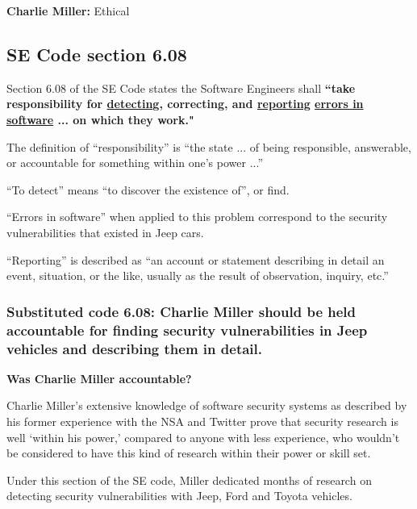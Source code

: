 \documentclass[12pt]{article}
\begin{document}
\begin{multicols}{2}
\begin{framed}
\hspace{-.5cm}\textbf{Charlie Miller:} Ethical
\end{framed}



\subsection{SE Code section 6.08}

Section 6.08 of the SE Code states the Software Engineers shall \textbf{``take responsibility for \underline{detecting}, correcting, and \underline{reporting} \underline{errors in software} ... on which they work."}\cite{seCode}

The definition of ``responsibility'' is ``the state ... of being responsible, answerable, or accountable for something within one's power ...''\cite{dictionary}

``To detect'' means ``to discover the existence of''\cite{dictionary}, or find.

``Errors in software'' when applied to this problem correspond to the security vulnerabilities that existed in Jeep cars. 

``Reporting'' is described as ``an account or statement describing in detail an event, situation, or the like, usually as the result of observation, inquiry, etc.''\cite{dictionary}

\subsubsection{Substituted code 6.08: Charlie Miller should be held accountable for finding security vulnerabilities in Jeep vehicles and describing them in detail.}




\textbf{Was Charlie Miller accountable?}

Charlie Miller's extensive knowledge of software security systems as described by his former experience with the NSA and Twitter\cite{linkedin} prove that security research is well `within his power,' compared to anyone with less experience, who wouldn't be considered to have this kind of research within their power or skill set.

Under this section of the SE code, Miller dedicated months of research on detecting security vulnerabilities with Jeep, Ford and Toyota vehicles.\cite{officialPaper}


\end{multicols}
\end{document}
